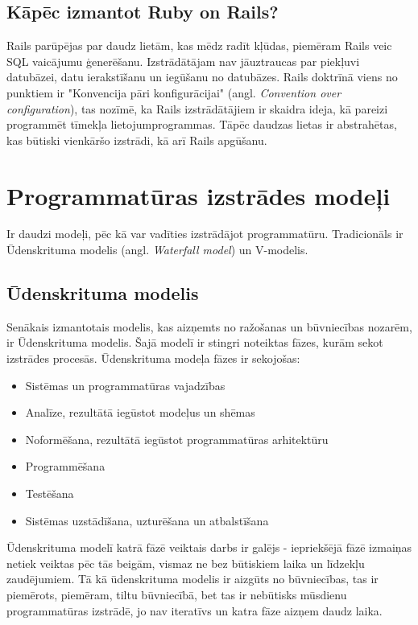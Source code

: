 \section{Kāpēc izmantot Ruby on Rails?}
Rails parūpējas par daudz lietām, kas mēdz radīt kļūdas, piemēram Rails veic SQL vaicājumu ģenerēšanu. Izstrādātājam nav jāuztraucas par piekļuvi datubāzei, datu ierakstīšanu un iegūšanu no datubāzes. Rails doktrīnā viens no punktiem ir "Konvencija pāri konfigurācijai" (angl. \textit{Convention over configuration}), tas nozīmē, ka Rails izstrādātājiem ir skaidra ideja, kā pareizi programmēt tīmekļa lietojumprogrammas. Tāpēc daudzas lietas ir abstrahētas, kas būtiski vienkāršo izstrādi, kā arī Rails apgūšanu.

\chapter{Programmatūras izstrādes modeļi}
Ir daudzi modeļi, pēc kā var vadīties izstrādājot programmatūru. Tradicionāls ir Ūdenskrituma modelis (angl. \textit{Waterfall model}) un V-modelis.
\section{Ūdenskrituma modelis}
Senākais izmantotais modelis, kas aizņemts no ražošanas un būvniecības nozarēm, ir Ūdenskrituma modelis. Šajā modelī ir stingri noteiktas fāzes, kurām sekot izstrādes procesās.
Ūdenskrituma modeļa fāzes ir sekojošas:
\begin{itemize}
	\item Sistēmas un programmatūras vajadzības
	\item Analīze, rezultātā iegūstot modeļus un shēmas
	\item Noformēšana, rezultātā iegūstot programmatūras arhitektūru
	\item Programmēšana
	\item Testēšana
	\item Sistēmas uzstādīšana, uzturēšana un atbalstīšana
\end{itemize}
Ūdenskrituma modelī katrā fāzē veiktais darbs ir galējs - iepriekšējā fāzē izmaiņas netiek veiktas pēc tās beigām, vismaz ne bez būtiskiem laika un līdzekļu zaudējumiem.
Tā kā ūdenskrituma modelis ir aizgūts no būvniecības, tas ir piemērots, piemēram, tiltu būvniecībā, bet tas ir nebūtisks mūsdienu programmatūras izstrādē, jo nav iteratīvs un katra fāze aizņem daudz laika.



